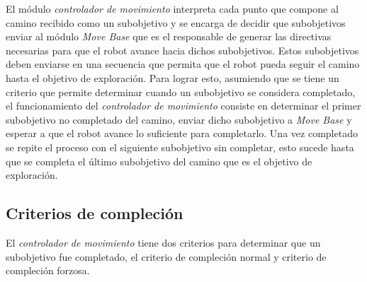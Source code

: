 


El módulo \emph{controlador de movimiento} interpreta cada punto que compone
al camino recibido como un subobjetivo y se encarga de decidir que subobjetivos
enviar al módulo \emph{Move Base} que es el responsable de generar las
directivas necesarias para que el robot avance hacia dichos subobjetivos. Estos
subobjetivos deben enviarse en una secuencia que permita que el robot pueda seguir el
camino hasta el objetivo de exploración. Para lograr esto, asumiendo que se tiene un criterio
que permite determinar cuando un subobjetivo se considera completado, el
funcionamiento del \emph{controlador de movimiento} consiste en determinar el
primer subobjetivo no completado del camino, enviar dicho subobjetivo a \emph{Move Base} y
esperar a que el robot avance lo suficiente para completarlo. Una vez
completado se repite el proceso con el siguiente subobjetivo sin completar, esto
sucede hasta que se completa el último subobjetivo del camino que
es el objetivo de exploración.


\subsection{Criterios de compleción}

El \emph{controlador de movimiento} tiene dos criterios para determinar que un
subobjetivo fue completado, el criterio de compleción normal y criterio de
compleción forzosa.

